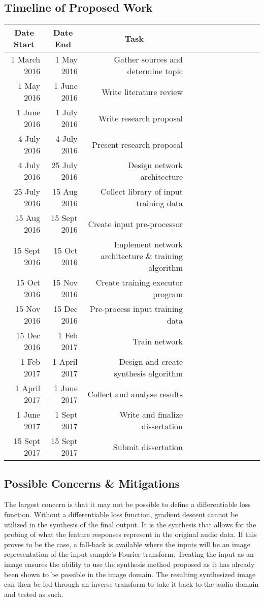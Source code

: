 \documentclass[12pt]{article}
\newcommand{\ra}[1]{\renewcommand{\arraystretch}{#1}}
\begin{document}
\subsection{Timeline of Proposed Work}
\ra{1.3}
\begin{tabular}{@{}rrrrcrrrcrrr@{}}
\toprule
\multicolumn{1}{c}{Date Start} & \multicolumn{1}{c}{Date End} & \multicolumn{1}{c}{Task}
\\\midrule
1 March 2016 & 1 May 2016 & Gather sources and determine topic \\
1 May 2016 & 1 June 2016 & Write literature review\\
1 June 2016 & 1 July 2016 & Write research proposal \\
4 July 2016 & 4 July 2016 & Present research proposal \\
4 July 2016 & 25 July 2016 & Design network architecture \\
25 July 2016 & 15 Aug 2016 & Collect library of input training data \\
15 Aug 2016 & 15 Sept 2016 & Create input pre-processor \\
15 Sept 2016 & 15 Oct 2016 & Implement network architecture \& training algorithm \\
15 Oct 2016 & 15 Nov 2016 & Create training executor program \\
15 Nov 2016 & 15 Dec 2016 & Pre-process input training data \\
15 Dec 2016 & 1 Feb 2017 & Train network \\
1 Feb 2017 & 1 April 2017 & Design and create synthesis algorithm \\
1 April 2017 & 1 June 2017 & Collect and analyse results \\
1 June 2017 & 1 Sept 2017 & Write and finalize dissertation \\
15 Sept 2017 & 15 Sept 2017 & Submit dissertation\\
\bottomrule
\end{tabular}

\subsection{Possible Concerns \& Mitigations}
The largest concern is that it may not be possible to define a differentiable loss function. Without a differentiable loss function, gradient descent cannot be utilized in the synthesis of the final output. It is the synthesis that allows for the probing of what the feature responses represent in the original audio data. If this proves to be the case, a fall-back is available where the inputs will be an image representation of the input sample's Fourier transform. Treating the input as an image ensures the ability to use the synthesis method proposed as it has already been shown to be possible in the image domain. The resulting synthesized image can then be fed through an inverse transform to take it back to the audio domain and tested as such.
\end{document}
